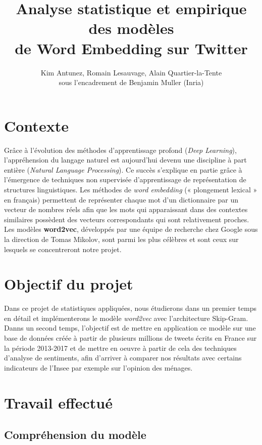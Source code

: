\documentclass[11pt,french,french]{article}
\title{Analyse statistique et empirique des modèles\\
de Word Embedding sur Twitter}
\author{Kim Antunez, Romain Lesauvage, Alain
Quartier-la-Tente\\[2\baselineskip]sous l'encadrement de Benjamin Muller
(Inria)}
\date{}
\begin{document}
\maketitle


\section{Contexte}\label{contexte}

Grâce à l'évolution des méthodes d'apprentissage profond (\emph{Deep
Learning}), l'appréhension du langage naturel est aujourd'hui devenu une
discipline à part entière (\emph{Natural Language Processing}). Ce
succès s'explique en partie grâce à l'émergence de techniques non
supervisée d'apprentissage de représentation de structures
linguistiques. Les méthodes de \emph{word embedding} (« plongement
lexical » en français) permettent de représenter chaque mot d'un
dictionnaire par un vecteur de nombres réels afin que les mots qui
apparaissant dans des contextes similaires possèdent des vecteurs
correspondants qui sont relativement proches. Les modèles
\textbf{word2vec}, développés par une équipe de recherche chez Google
sous la direction de Tomas Mikolov, sont parmi les plus célèbres et sont
ceux sur lesquels se concentreront notre projet.

\section{Objectif du projet}\label{objectif-du-projet}

Dans ce projet de statistiques appliquées, nous étudierons dans un
premier temps en détail et implémenterons le modèle \emph{word2vec} avec
l'architecture Skip-Gram. Danns un second temps, l'objectif est de
mettre en application ce modèle sur une base de données créée à partir
de plusieurs millions de tweets écrits en France sur la période
2013-2017 et de mettre en oeuvre à partir de cela des techniques
d'analyse de sentiments, afin d'arriver à comparer nos résultats avec
certains indicateurs de l'Insee par exemple sur l'opinion des ménages.

\section{Travail effectué}\label{travail-effectuuxe9}

\subsection{Compréhension du
modèle}\label{compruxe9hension-du-moduxe8le}
\end{document}
